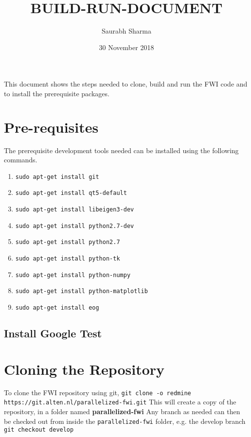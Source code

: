 \documentclass[10pt]{article}
\title{BUILD-RUN-DOCUMENT}
\author{Saurabh Sharma}
\date{30 November 2018}
\begin{document}
\maketitle
\noindent This document shows the steps needed to clone, build and run the FWI code and to install the prerequisite packages. 
\section{Pre-requisites}
The prerequisite development tools needed can be installed using the following commands.

\begin{enumerate}
    \item \texttt{sudo apt-get install git}  
    \item \texttt{sudo apt-get install qt5-default}
    \item \texttt{sudo apt-get install libeigen3-dev}
    \item \texttt{sudo apt-get install python2.7-dev}
    \item \texttt{sudo apt-get install python2.7}
    \item \texttt{sudo apt-get install python-tk}
    \item \texttt{sudo apt-get install python-numpy}
    \item \texttt{sudo apt-get install python-matplotlib}
  	\item \texttt{sudo apt-get install eog}

\end{enumerate}
\subsection{Install Google Test}

\section{Cloning the Repository}
\noindent To clone the FWI repository using git,
\newline
\texttt{git clone -o redmine https://git.alten.nl/parallelized-fwi.git}
\newline
This will create a copy of the repository, in a folder named \textbf{parallelized-fwi}
\newline
Any branch as needed can then be checked out from inside the \texttt{parallelized-fwi} folder, e.g. the develop branch
\newline
\texttt{git checkout develop}
\end{document}
